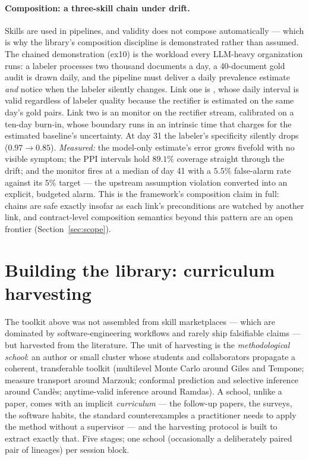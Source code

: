 \documentclass[11pt,a4paper]{article}
\begin{document}
\paragraph{Composition: a three-skill chain under drift.} Skills are used
in pipelines, and validity does not compose automatically --- which is why
the library's composition discipline is demonstrated rather than assumed.
The chained demonstration (ex10) is the workload every LLM-heavy
organization runs: a labeler processes two thousand documents a day, a
40-document gold audit is drawn daily, and the pipeline must deliver a
daily prevalence estimate \emph{and} notice when the labeler silently
changes. Link one is , whose daily
interval is valid regardless of labeler quality because the rectifier is
estimated on the same day's gold pairs. Link two is an
 monitor on the rectifier stream, calibrated on a
ten-day burn-in, whose boundary runs in an intrinsic time that charges for
the estimated baseline's uncertainty. At day 31 the labeler's specificity
silently drops ($0.97\to0.85$). \emph{Measured:} the model-only estimate's
error grows fivefold with no visible symptom; the PPI intervals hold
$89.1\%$ coverage straight through the drift; and the monitor fires at a
median of day 41 with a $5.5\%$ false-alarm rate against its $5\%$ target
--- the upstream assumption violation converted into an explicit,
budgeted alarm. This is the framework's composition claim in full: chains
are safe exactly insofar as each link's preconditions are watched by
another link, and contract-level composition semantics beyond this
pattern are an open frontier (Section~\ref{sec:scope}).

\section{Building the library: curriculum harvesting}\label{sec:harvest}

The toolkit above was not assembled from skill marketplaces --- which are
dominated by software-engineering workflows and rarely ship falsifiable
claims --- but harvested from the literature. The unit of harvesting is the
\emph{methodological school}: an author or small cluster whose students and
collaborators propagate a coherent, transferable toolkit (multilevel Monte
Carlo around Giles and Tempone; measure transport around Marzouk; conformal
prediction and selective inference around Cand\`es; anytime-valid inference
around Ramdas). A school, unlike a paper, comes with an implicit
\emph{curriculum} --- the follow-up papers, the surveys, the software
habits, the standard counterexamples a practitioner needs to apply the
method without a supervisor --- and the harvesting protocol is built to
extract exactly that. Five stages; one school (occasionally a deliberately
paired pair of lineages) per session block.
\end{document}
